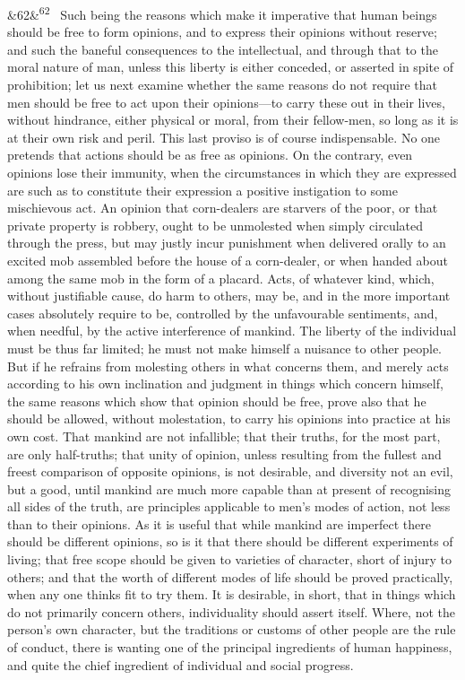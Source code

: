 \documentclass[12pt]{article}
\newcommand{\para}[1][]{\par\noindent\ifx&#1&\else\textsuperscript{\footnotesize #1}~\fi}
\begin{document}
\para[62] Such being the reasons which make it imperative that human beings should be free to form opinions, and to express their opinions without reserve; and such the baneful consequences to the intellectual, and through that to the moral nature of man, unless this liberty is either conceded, or asserted in spite of prohibition; let us next examine whether the same reasons do not require that men should be free to act upon their opinions---to carry these out in their lives, without hindrance, either physical or moral, from their fellow-men, so long as it is at their own risk and peril. This last proviso is of course indispensable. No one pretends that actions should be as free as opinions. On the contrary, even opinions lose their immunity, when the circumstances in which they are expressed are such as to constitute their expression a positive instigation to some mischievous act. An opinion that corn-dealers are starvers of the poor, or that private property is robbery, ought to be unmolested when simply circulated through the press, but may justly incur punishment when delivered orally to an excited mob assembled before the house of a corn-dealer, or when handed about among the same mob in the form of a placard. Acts, of whatever kind, which, without justifiable cause, do harm to others, may be, and in the more important cases absolutely require to be, controlled by the unfavourable sentiments, and, when needful, by the active interference of mankind. The liberty of the individual must be thus far limited; he must not make himself a nuisance to other people. But if he refrains from molesting others in what concerns them, and merely acts according to his own inclination and judgment in things which concern himself, the same reasons which show that opinion should be free, prove also that he should be allowed, without molestation, to carry his opinions into practice at his own cost. That mankind are not infallible; that their truths, for the most part, are only half-truths; that unity of opinion, unless resulting from the fullest and freest comparison of opposite opinions, is not desirable, and diversity not an evil, but a good, until mankind are much more capable than at present of recognising all sides of the truth, are principles applicable to men's modes of action, not less than to their opinions. As it is useful that while mankind are imperfect there should be different opinions, so is it that there should be different experiments of living; that free scope should be given to varieties of character, short of injury to others; and that the worth of different modes of life should be proved practically, when any one thinks fit to try them. It is desirable, in short, that in things which do not primarily concern others, individuality should assert itself. Where, not the person's own character, but the traditions or customs of other people are the rule of conduct, there is wanting one of the principal ingredients of human happiness, and quite the chief ingredient of individual and social progress.
\end{document}
